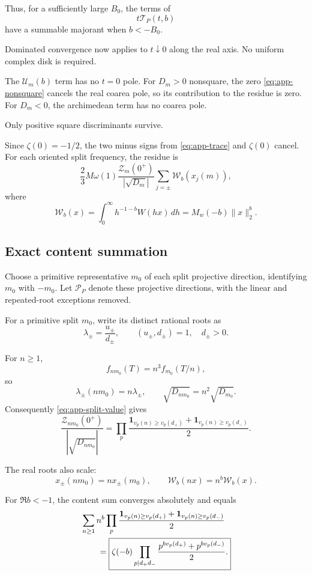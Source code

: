 \documentclass[11pt]{article}
\begin{document}
Thus, for a sufficiently large $B_0$,
the terms of
\[
t\mathcal T_P(t,b)
\]
have a summable majorant when
$b<-B_0$.

Dominated convergence now applies to
$t\downarrow0$ along the real axis.
No uniform complex disk is required.

The $\mathcal U_m(b)$ term has no
$t=0$ pole. For $D_m>0$ nonsquare,
the zero \eqref{eq:app-nonsquare}
cancels the real coarea pole, so its
contribution to the residue is zero.
For $D_m<0$, the archimedean term
has no coarea pole.

Only positive square discriminants
survive.

Since $\zeta(0)=-1/2$, the two minus
signs from \eqref{eq:app-trace} and
$\zeta(0)$ cancel. For each oriented
split frequency, the residue is
\begin{equation}\label{eq:app-oriented}
\boxed{
\frac23M\omega(1)
\frac{\mathcal Z_m(0^+)}
{|\sqrt{D_m}|}
\sum_{j=\pm}\mathcal W_b(x_j(m)),
}
\end{equation}
where
\[
\mathcal W_b(x)=
\int_0^\infty h^{-1-b}W(hx)\,dh
=M_w(-b)\|x\|_2^b.
\]

\subsection{Exact content summation}

Choose a primitive representative $m_0$
of each split projective direction,
identifying $m_0$ with $-m_0$.
Let $\mathcal P_P$ denote these
projective directions, with the
linear and repeated-root exceptions
removed.

For a primitive split $m_0$, write
its distinct rational roots as
\[
\lambda_\pm=\frac{u_\pm}{d_\pm},
\qquad
(u_\pm,d_\pm)=1,\quad d_\pm>0.
\]

For $n\ge1$,
\[
f_{nm_0}(T)=n^3f_{m_0}(T/n),
\]
so
\[
\lambda_\pm(nm_0)=n\lambda_\pm,
\qquad
\sqrt{D_{nm_0}}=n^2\sqrt{D_{m_0}}.
\]
Consequently \eqref{eq:app-split-value}
gives
\[
\frac{\mathcal Z_{nm_0}(0^+)}
{|\sqrt{D_{nm_0}}|}
=
\prod_p
\frac{
\mathbf1_{v_p(n)\ge v_p(d_+)}
+\mathbf1_{v_p(n)\ge v_p(d_-)}
}{2}.
\]

The real roots also scale:
\[
x_\pm(nm_0)=nx_\pm(m_0),
\qquad
\mathcal W_b(nx)=n^b\mathcal W_b(x).
\]

For $\Re b<-1$, the content sum
converges absolutely and equals
\begin{align}
&\sum_{n\ge1}n^b
\prod_p
\frac{
\mathbf1_{v_p(n)\ge v_p(d_+)}
+\mathbf1_{v_p(n)\ge v_p(d_-)}
}{2}\notag\\
&\qquad=
\boxed{
\zeta(-b)
\prod_{p\mid d_+d_-}
\frac{
p^{b v_p(d_+)}
+p^{b v_p(d_-)}
}{2}.
}
\label{eq:app-content}
\end{align}
\end{document}
